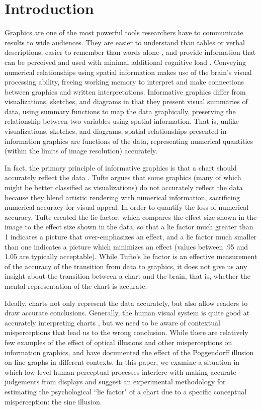 \documentclass[11pt]{isuthesis}\usepackage[]{graphicx}\usepackage[]{color}
\begin{document}
\section{Introduction}
Graphics are one of the most powerful tools researchers have to communicate results to wide audiences. They are easier to understand than tables or verbal descriptions\citep{larkin1987diagram}, easier to remember than words alone \citep{mayer1994whom}, and provide information that can be perceived and used with minimal additional cognitive load \citep{zhang1994representations}. Conveying numerical relationships using spatial information makes use of the brain's visual processing ability, freeing working memory to interpret and make connections between graphics and written interpretations. Informative graphics differ from visualizations, sketches, and diagrams in that they present visual summaries of data, using summary functions to map the data graphically, preserving the relationship between two variables using spatial information. That is, unlike visualizations, sketches, and diagrams, spatial relationships presented in information graphics are functions of the data, representing numerical quantities (within the limits of image resolution) accurately. 

In fact, the primary principle of informative graphics is that a chart should accurately reflect the data \citep{tufte}. Tufte argues that some graphics (many of which might be better classified as visualizations) do not accurately reflect the data because they blend artistic rendering with numerical information, sacrificing numerical accuracy for visual appeal. In order to quantify the loss of numerical accuracy, Tufte created the lie factor, which compares the effect size shown in the image to the effect size shown in the data, so that a lie factor much greater than 1 indicates a picture that over-emphasizes an effect, and a lie factor much smaller than one indicates a picture which minimizes an effect (values between .95 and 1.05 are typically acceptable). While Tufte's lie factor is an effective measurement of the accuracy of the transition from data to graphics, it does not give us any insight about the transition between a chart and the brain, that is, whether the mental representation of the chart is accurate.

Ideally, charts not only represent the data accurately, but  also allow readers to draw accurate conclusions. Generally, the human visual system is quite good at accurately interpreting charts \citep{cleveland:1984,kosara2010}, but we need to be aware of contextual misperceptions that lead us to the wrong conclusion. While there are relatively few examples of the effect of optical illusions and other misperceptions on information graphics, \citet{amer2005bias} and \citet{poulton1985geometric} have documented the effect of the Poggendorff illusion on line graphs in different contexts. In this paper, we examine a situation in which low-level human perceptual processes interfere with making accurate judgements from displays and suggest an experimental methodology for estimating the psychological ``lie factor" of a chart due to a specific conceptual misperception: the sine illusion. 
\end{document}
